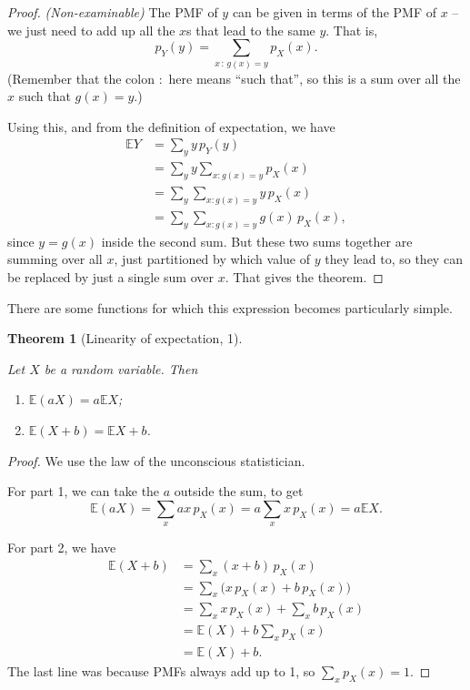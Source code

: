 \documentclass[
  a4paper,
]{book}
\providecommand{\tightlist}{%
  \setlength{\itemsep}{0pt}\setlength{\parskip}{0pt}}
\newtheorem{theorem}{Theorem}[chapter]
\theoremstyle{definition}
\theoremstyle{definition}
\theoremstyle{definition}
\theoremstyle{definition}
\theoremstyle{remark}
\begin{document}
\begin{proof}
\emph{(Non-examinable)}
The PMF of \(y\) can be given in terms of the PMF of \(x\) -- we just need to add up all the \(x\)s that lead to the same \(y\). That is,
\[ p_Y(y) = \sum_{x\, :\, g(x) = y} p_X(x) . \]
(Remember that the colon \(:\) here means ``such that'', so this is a sum over all the \(x\) such that \(g(x) = y\).)

Using this, and from the definition of expectation, we have
\begin{align*}
  \mathbb EY &= \sum_y y \, p_Y(y) \\
    &= \sum_y y \sum_{x : g(x) = y} p_X(x) \\
    &= \sum_y \sum_{x : g(x) = y} y\,p_X(x) \\
    &= \sum_y \sum_{x : g(x) = y} g(x) \, p_X(x) ,
\end{align*}
since \(y = g(x)\) inside the second sum. But these two sums together are summing over all \(x\), just partitioned by which value of \(y\) they lead to, so they can be replaced by just a single sum over \(x\). That gives the theorem.
\end{proof}

There are some functions for which this expression becomes particularly simple.

\begin{theorem}[Linearity of expectation, 1]
\protect\hypertarget{thm:linearity1}{}\label{thm:linearity1}

Let \(X\) be a random variable. Then

\begin{enumerate}
\def\labelenumi{\arabic{enumi}.}
\tightlist
\item
  \(\mathbb E(aX) = a\mathbb EX\);
\item
  \(\mathbb E(X + b) = \mathbb EX + b\).
\end{enumerate}

\end{theorem}

\begin{proof}
We use the law of the unconscious statistician.

For part 1, we can take the \(a\) outside the sum, to get
\[ \mathbb E(aX) = \sum_x ax\, p_X(x) = a\sum_x x\, p_X(x) = a\mathbb EX . \]

For part 2, we have
\begin{align*}
  \mathbb E(X+b) &= \sum_x (x + b)\, p_X(x) \\
    &= \sum_x \big( x\, p_X(x) + b\,p_X(x) \big) \\
    &= \sum_x x\, p_X(x) + \sum_x b\,p_X(x) \\
    &= \mathbb E(X) + b \sum_x p_X(x) \\
    &= \mathbb E(X) + b .
\end{align*}
The last line was because PMFs always add up to 1, so \(\sum_x p_X(x) = 1\).
\end{proof}
\end{document}
